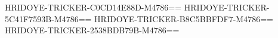 HRIDOYE-TRICKER-C0CD14E88D-M4786==
HRIDOYE-TRICKER-5C41F7593B-M4786==
HRIDOYE-TRICKER-B8C5BBFDF7-M4786==
HRIDOYE-TRICKER-2538BDB79B-M4786==
